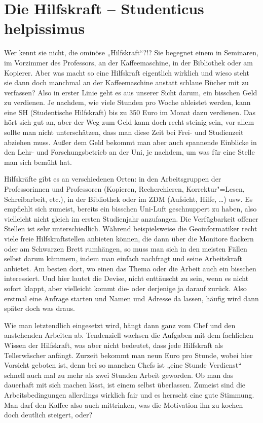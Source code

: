 \section{Die Hilfskraft – Studenticus helpissimus}
Wer kennt sie nicht, die ominöse „Hilfskraft“?!? Sie begegnet einem in Seminaren, im Vorzimmer des Professors, an der Kaffeemaschine, in der Bibliothek oder am Kopierer. Aber was macht so eine Hilfskraft eigentlich wirklich und wieso steht sie dann doch manchmal an der Kaffeemaschine anstatt schlaue Bücher mit zu verfassen? Also in erster Linie geht es aus unserer Sicht darum, ein bisschen Geld zu verdienen. Je nachdem, wie viele Stunden pro Woche ableistet werden, kann eine SH (Studentische Hilfskraft) bis zu 350 Euro im Monat dazu verdienen. Das hört sich gut an, aber der Weg zum Geld kann doch recht steinig sein, vor allem sollte man nicht unterschätzen, dass man diese Zeit bei Frei- und Studienzeit abziehen muss. Außer dem Geld bekommt man aber auch spannende Einblicke in den Lehr- und Forschungsbetrieb an der Uni, je nachdem, um was für eine Stelle man sich bemüht hat.\par
Hilfskräfte gibt es an verschiedenen Orten: in den Arbeitsgruppen der Professorinnen und Professoren (Kopieren, Recherchieren, Korrektur"=Lesen, Schreibarbeit, etc.), in der Bibliothek oder im ZDM (Aufsicht, Hilfe, …) usw. Es empfiehlt sich zumeist, bereits ein bisschen Uni-Luft geschnuppert zu haben, also vielleicht nicht gleich im ersten Studienjahr anzufangen. Die Verfügbarkeit offener Stellen ist sehr unterschiedlich. Während beispielsweise die Geoinformatiker recht viele freie Hilfskraftstellen anbieten können, die dann über die Monitore flackern oder am Schwarzen Brett rumhängen, so muss man sich in den meisten Fällen selbst darum kümmern, indem man einfach nachfragt und seine Arbeitskraft anbietet. Am besten dort, wo einen das Thema oder die Arbeit auch ein bisschen interessiert. Und hier lautet die Devise, nicht enttäuscht zu sein, wenn es nicht sofort klappt, aber vielleicht kommt die- oder derjenige ja darauf zurück. Also erstmal eine Anfrage starten und Namen und Adresse da lassen, häufig wird dann später doch was draus. 
\par
Wie man letztendlich eingesetzt wird, hängt dann ganz vom Chef und den anstehenden Arbeiten ab. Tendenziell wachsen die Aufgaben mit dem fachlichen Wissen der Hilfskraft, was aber nicht bedeutet, dass jede Hilfskraft als Tellerwäscher anfängt. Zurzeit bekommt man neun Euro pro Stunde, wobei hier Vorsicht geboten ist, denn bei so manchen Chefs ist „eine Stunde Verdienst“ schnell auch mal zu mehr als zwei Stunden Arbeit geworden. Ob man das dauerhaft mit sich machen lässt, ist einem selbst überlassen. Zumeist sind die Arbeitsbedingungen allerdings wirklich fair und es herrscht eine gute Stimmung. Man darf den Kaffee also auch mittrinken, was die Motivation ihn zu kochen doch deutlich steigert, oder? \par
